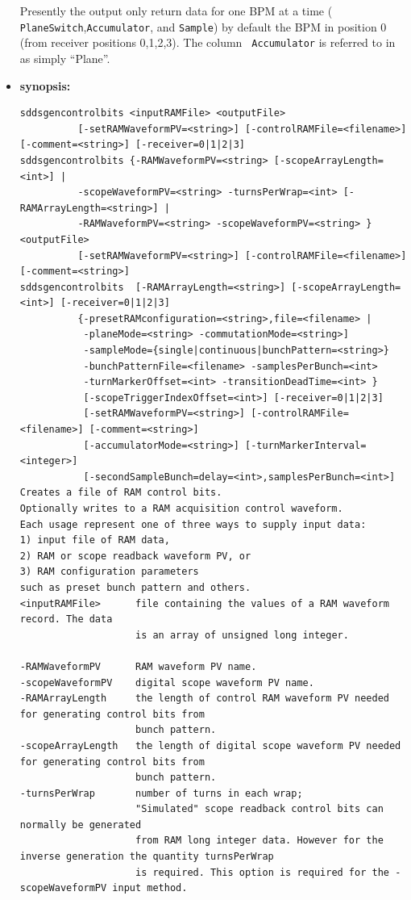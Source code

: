 \begin{itemize}
Presently the output only return data for one BPM at a time ({\tt
PlaneSwitch},{\tt Accumulator}, and {\tt Sample}) by default the BPM
in position 0 (from receiver positions 0,1,2,3). The column {\tt
Accumulator} is referred to in \cite{Norum2007} as simply ``Plane''.

\item {\bf synopsis:} 
%
%
\small
\begin{verbatim}
sddsgencontrolbits <inputRAMFile> <outputFile>
          [-setRAMWaveformPV=<string>] [-controlRAMFile=<filename>] [-comment=<string>] [-receiver=0|1|2|3]
sddsgencontrolbits {-RAMWaveformPV=<string> [-scopeArrayLength=<int>] |
          -scopeWaveformPV=<string> -turnsPerWrap=<int> [-RAMArrayLength=<string>] |
          -RAMWaveformPV=<string> -scopeWaveformPV=<string> } <outputFile>
          [-setRAMWaveformPV=<string>] [-controlRAMFile=<filename>] [-comment=<string>]
sddsgencontrolbits  [-RAMArrayLength=<string>] [-scopeArrayLength=<int>] [-receiver=0|1|2|3]
          {-presetRAMconfiguration=<string>,file=<filename> |
           -planeMode=<string> -commutationMode=<string>]
           -sampleMode={single|continuous|bunchPattern=<string>}
           -bunchPatternFile=<filename> -samplesPerBunch=<int>
           -turnMarkerOffset=<int> -transitionDeadTime=<int> }
           [-scopeTriggerIndexOffset=<int>] [-receiver=0|1|2|3]
           [-setRAMWaveformPV=<string>] [-controlRAMFile=<filename>] [-comment=<string>]
           [-accumulatorMode=<string>] [-turnMarkerInterval=<integer>]
           [-secondSampleBunch=delay=<int>,samplesPerBunch=<int>]
Creates a file of RAM control bits.
Optionally writes to a RAM acquisition control waveform.
Each usage represent one of three ways to supply input data:
1) input file of RAM data,
2) RAM or scope readback waveform PV, or
3) RAM configuration parameters 
such as preset bunch pattern and others.
<inputRAMFile>      file containing the values of a RAM waveform record. The data 
                    is an array of unsigned long integer.

-RAMWaveformPV      RAM waveform PV name. 
-scopeWaveformPV    digital scope waveform PV name. 
-RAMArrayLength     the length of control RAM waveform PV needed for generating control bits from 
                    bunch pattern.
-scopeArrayLength   the length of digital scope waveform PV needed for generating control bits from 
                    bunch pattern.
-turnsPerWrap       number of turns in each wrap; 
                    "Simulated" scope readback control bits can normally be generated 
                    from RAM long integer data. However for the inverse generation the quantity turnsPerWrap 
                    is required. This option is required for the -scopeWaveformPV input method.


\end{verbatim}
\end{itemize}
